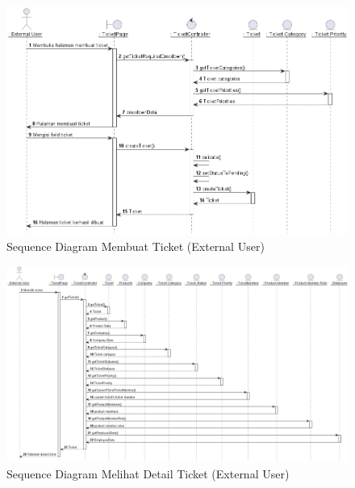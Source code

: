 \documentclass[12pt]{article}
\begin{document}
\begin{enumerate}[label=\textbf{4.\arabic*.}]
\begin{enumerate} [label=\textbf{4.2.\arabic*.}, wide, labelwidth=!, labelindent=0pt]
\begin{enumerate}[label=\textbf{4.2.2.\arabic*.}, wide, labelwidth=!, labelindent=0pt]
\begin{enumerate}[label=\arabic*.]
                \begin{figure}
                    \centering \includegraphics[height=0.575\textheight]{out/plantuml/sequence/ex/ex3/Membuat Ticket.png}
                    \caption{Sequence Diagram Membuat Ticket (External User)}
                    \label{fig:SQ-PIC-03}
                \end{figure}

                \begin{figure}
                    \centering \includegraphics[height=0.575\textheight]{out/plantuml/sequence/ex/ex4/Melihat Detail Ticket.png}
                    \caption{Sequence Diagram Melihat Detail Ticket (External User)}
                    \label{fig:SQ-PIC-04}
                \end{figure}


\end{enumerate}
\end{enumerate}
\end{enumerate}
\end{enumerate}
\end{document}
